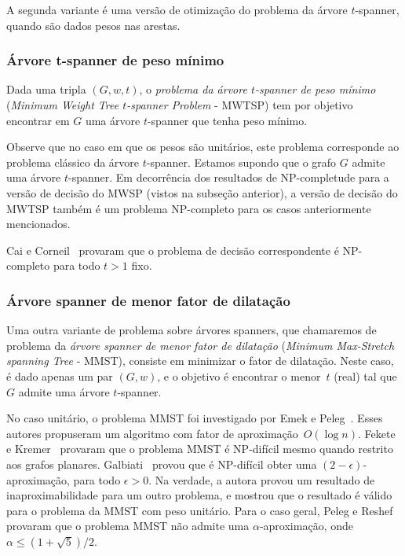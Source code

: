 

A segunda variante é uma versão de otimização do problema da árvore $t$-spanner, quando são dados pesos nas arestas.

\subsubsection{Árvore t-spanner de peso mínimo}
\label{sec:arv_spanner_custo_min}
Dada uma tripla $(G,w,t)$, o \emph{problema da árvore $t$-spanner de peso mínimo} (\emph{Minimum Weight Tree \hbox{$t$-spanner} Problem} - MWTSP) tem por objetivo encontrar em $G$ uma árvore $t$-spanner que tenha peso mínimo. 


Observe que no caso em que os pesos são unitários, este problema corresponde ao problema clássico da árvore $t$-spanner.  Estamos supondo que o grafo $G$ admite uma árvore $t$-spanner. Em decorrência dos resultados de NP-completude para a versão de decisão do MWSP (vistos na subseção anterior), a versão de decisão do MWTSP também é um problema NP-completo para os casos anteriormente mencionados.

Cai e Corneil~\cite{CaiC1995} provaram que o problema de decisão correspondente é NP-completo para todo $t>1$ fixo. 



\subsubsection{Árvore spanner de menor fator de dilatação}
\label{sec:comp_arv_span_minima}

Uma outra variante de problema sobre árvores spanners, que chamaremos de problema da \emph{árvore spanner de menor fator de dilatação} (\emph{Minimum Max-Stretch spanning Tree} - MMST),
consiste em minimizar o fator de dilatação.  Neste caso, é dado apenas um par $(G,w)$, e o objetivo é encontrar o menor~$t$ (real) tal que $G$ admite uma árvore $t$-spanner.

No caso unitário, o problema MMST foi investigado por Emek e Peleg~\cite{EmekP2008}.  Esses autores propuseram um algoritmo com fator de aproximação~$O(\log n)$. Fekete e Kremer~\cite{FeketeK2001} provaram que o problema MMST é NP-difícil mesmo quando restrito aos grafos planares.  Galbiati~\cite{Galbiati2001} provou que é NP-difícil obter uma $(2 - \epsilon)$-aproximação, para todo $\epsilon > 0$. Na verdade, a autora provou um resultado de inaproximabilidade para um outro problema, e mostrou que o resultado é válido para o problema da MMST com peso unitário.  Para o caso geral, Peleg e Reshef~\cite{PelegR1999} provaram que o problema MMST não admite uma $\alpha$-aproximação, onde $\alpha\leq (1 +\sqrt{5})/2$.

